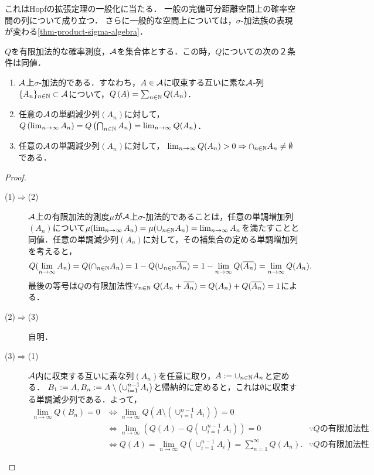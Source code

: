 \documentclass[uplatex,dvipdfmx]{jsreport}
\begin{document}
\begin{remark}
    これはHopfの拡張定理の一般化に当たる．
    一般の完備可分距離空間上の確率空間の列について成り立つ．
    さらに一般的な空間上については，$\sigma$-加法族の表現が変わる\ref{thm-product-sigma-algebra}．
\end{remark}

\begin{lemma}[有限加法的確率空間の完全加法性の単調族による特徴付け]
    $Q$を有限加法的な確率測度，$\mathcal{A}$を集合体とする．この時，$Q$についての次の２条件は同値．
    \begin{enumerate}
        \item $\mathcal{A}$上$\sigma$-加法的である．すなわち，$A\in\mathcal{A}$に収束する互いに素な$\mathcal{A}$-列$\{A_n\}_{n\in\mathbb{N}}\subset\mathcal{A}$について，$Q\left(A\right)=\sum_{n\in\mathbb{N}}Q(A_n)$．
        \item 任意の$\mathcal{A}$の単調減少列$(A_n)$に対して，$Q\left(\lim_{n\to\infty}A_n\right)=Q\left(\bigcap_{n\in\mathbb{N}}A_n\right)=\lim_{n\to\infty}Q(A_n)$．
        \item 任意の$\mathcal{A}$の単調減少列$(A_n)$に対して，
        $\lim_{n\to\infty}Q(A_n)>0\Rightarrow\cap_{n\in\mathbb{N}}A_n\ne\emptyset$である．
    \end{enumerate}
\end{lemma}
\begin{proof}\mbox{}
    \begin{description}
        \item[(1)$\Rightarrow$(2)] $\mathcal{A}$上の有限加法的測度$\mu$が$\mathcal{A}$上$\sigma$-加法的であることは，任意の単調増加列$(A_n)$について$\mu(\lim_{n\to\infty}A_n)=\mu(\cup_{n\in\mathbb{N}}A_n)=\lim_{n\to\infty}A_n$を満たすことと同値．任意の単調減少列$(A_n)$に対して，その補集合の定める単調増加列を考えると，\[Q(\lim_{n\to\infty}A_n)=Q(\cap_{n\in\mathbb{N}}A_n)=1-Q(\cup_{n\in\mathbb{N}}\overline{A_n})=1-\lim_{n\to\infty}Q(\overline{A_n})=\lim_{n\to\infty}Q(A_n).\]最後の等号は$Q$の有限加法性$\forall_{n\in\mathbb{N}}\;Q(A_n+\overline{A_n})=Q(A_n)+Q(\overline{A_n})=1$による．
        \item[(2)$\Rightarrow$(3)] 自明．
        \item[(3)$\Rightarrow$(1)] $\mathcal{A}$内に収束する互いに素な列$(A_n)$を任意に取り，$A:=\cup_{n\in\mathbb{N}}A_n$と定める．
        $B_1:=A,B_n:=A\setminus\left(\cup_{i=1}^{n-1}A_{i}\right)$と帰納的に定めると，これは$\emptyset$に収束する単調減少列である．よって，
        \begin{align*}
            \lim_{n\to\infty}Q(B_n)=0&\Leftrightarrow \lim_{n\to\infty}Q(A\setminus(\cup_{i=1}^{n-1}A_i))=0\\
            &\Leftrightarrow \lim_{n\to\infty}(Q(A)-Q(\cup_{i=1}^{n-1}A_i))=0&\because Qの有限加法性\\
            &\Leftrightarrow Q(A)=\lim_{n\to\infty}Q(\cup_{i=1}^{n-1}A_i)=\sum_{n=1}^\infty Q(A_n).&\because Qの有限加法性
        \end{align*}
    \end{description}
\end{proof}
\end{document}
